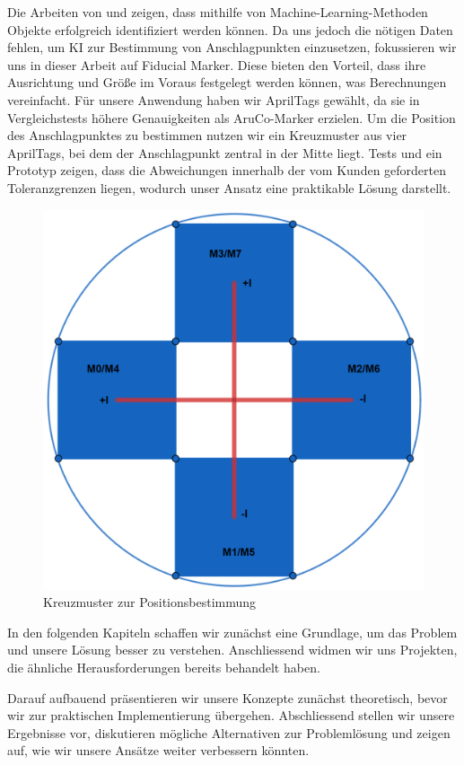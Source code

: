 Die Arbeiten von \cite{yong_object_2023} und \cite{zhou_image-based_2021} zeigen, dass mithilfe von Machine-Learning-Methoden Objekte erfolgreich identifiziert werden können.
Da uns jedoch die nötigen Daten fehlen, um KI zur Bestimmung von Anschlagpunkten einzusetzen, fokussieren wir uns in dieser Arbeit auf Fiducial Marker. Diese bieten den Vorteil, 
dass ihre Ausrichtung und Größe im Voraus festgelegt werden können, was Berechnungen vereinfacht. Für unsere Anwendung haben wir AprilTags gewählt, da sie in Vergleichstests höhere 
Genauigkeiten als AruCo-Marker erzielen. Um die Position des Anschlagpunktes zu bestimmen nutzen wir ein Kreuzmuster aus vier AprilTags, bei dem der Anschlagpunkt zentral in der Mitte liegt.
Tests und ein Prototyp zeigen, dass die Abweichungen innerhalb der vom Kunden geforderten Toleranzgrenzen liegen, wodurch unser Ansatz eine praktikable Lösung darstellt.

\begin{figure}[H]
    \centering
    \includegraphics[width=0.5\linewidth]{graphics/marker_anordnung.png}
    \caption{Kreuzmuster zur Positionsbestimmung}
\end{figure}


In den folgenden Kapiteln schaffen wir zunächst eine Grundlage, um das Problem und unsere Lösung besser zu verstehen. Anschliessend 
widmen wir uns Projekten, die ähnliche Herausforderungen bereits behandelt haben.

Darauf aufbauend präsentieren wir unsere Konzepte zunächst theoretisch, bevor wir zur praktischen Implementierung 
übergehen. Abschliessend stellen wir unsere Ergebnisse vor, diskutieren mögliche Alternativen zur Problemlösung und 
zeigen auf, wie wir unsere Ansätze weiter verbessern könnten.


